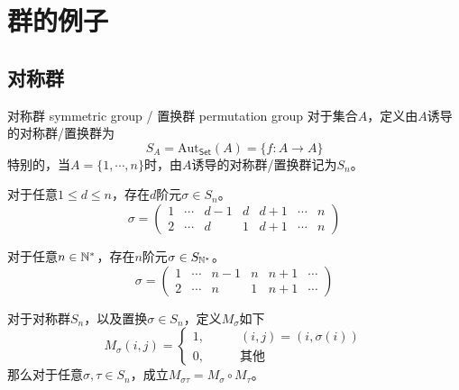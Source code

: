 \section{群的例子}

\subsection{对称群}

\begin{definition}{对称群 symmetric group / 置换群 permutation group}
	对于集合$A$，定义由$A$诱导的对称群/置换群为
	$$
	S_A=\mathrm{Aut}_{\mathsf{Set}}(A)=\{ f:A\to A \}
	$$
	特别的，当$A=\{ 1,\cdots,n \}$时，由$A$诱导的对称群/置换群记为$S_n$。
\end{definition}

\begin{example}
	对于任意$1\le d\le n$，存在$d$阶元$\sigma\in S_n$。
	$$
	\sigma=\begin{pmatrix}
		1&\cdots& d-1 &d&d+1&\cdots& n\\
		2&\cdots& d &1&d+1&\cdots& n
	\end{pmatrix}
	$$
\end{example}

\begin{example}
	对于任意$n\in \mathbb{N}^*$，存在$n$阶元$\sigma\in S_{\mathbb{N}^*}$。
	$$
	\sigma=\begin{pmatrix}
		1&\cdots& n-1 &n&n+1&\cdots\\
		2&\cdots& n &1&n+1&\cdots
	\end{pmatrix}
	$$
\end{example}

\begin{proposition}
	对于对称群$S_n$，以及置换$\sigma\in S_n$，定义$M_\sigma$如下
	$$
	M_\sigma(i,j)=\begin{cases}
		1,\qquad & (i,j)=(i,\sigma(i))\\
		0,\qquad & \text{其他}
	\end{cases}
	$$
	那么对于任意$\sigma,\tau\in S_n$，成立$M_{\sigma\tau}=M_\sigma\circ M_\tau$。
\end{proposition}

